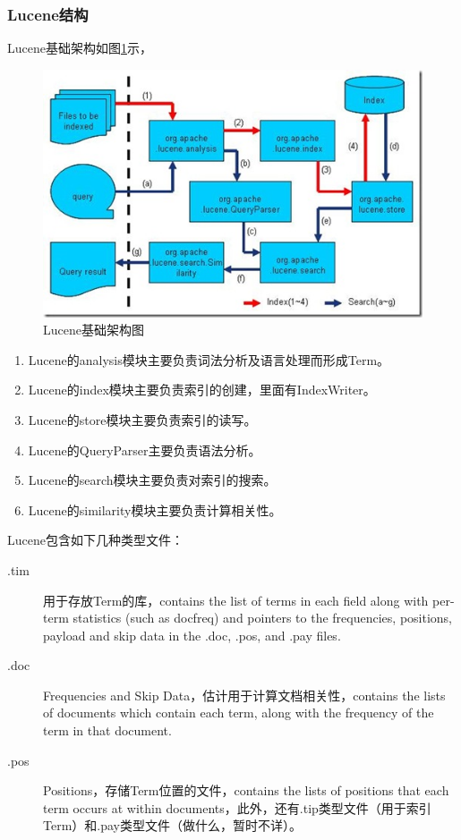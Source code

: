\subsubsection{Lucene结构}
Lucene基础架构如图\ref{fig-lucene-1}示，
\begin{figure}[htbp]
\centering\includegraphics[width=.7\linewidth]{figures/lucene-architect.jpg}
\caption{Lucene基础架构图}\label{fig-lucene-1}
\end{figure} 
\begin{enumerate}[(1)]
\item Lucene的analysis模块主要负责词法分析及语言处理而形成Term。
\item Lucene的index模块主要负责索引的创建，里面有IndexWriter。
\item Lucene的store模块主要负责索引的读写。
\item Lucene的QueryParser主要负责语法分析。
\item Lucene的search模块主要负责对索引的搜索。
\item Lucene的similarity模块主要负责计算相关性。
\end{enumerate}
\par Lucene包含如下几种类型文件：
\begin{description}
\item [.tim]用于存放Term的库，contains the list of terms in each field along with per-term statistics (such as docfreq) and pointers to the frequencies, positions, payload and skip data in the .doc, .pos, and .pay files.
\item [.doc]Frequencies and Skip Data，估计用于计算文档相关性，contains the lists of documents which contain each term, along with the frequency of the term in that document.
\item [.pos]Positions，存储Term位置的文件，contains the lists of positions that each term occurs at within documents，此外，还有.tip类型文件（用于索引Term）和.pay类型文件（做什么，暂时不详）。
\end{description}
